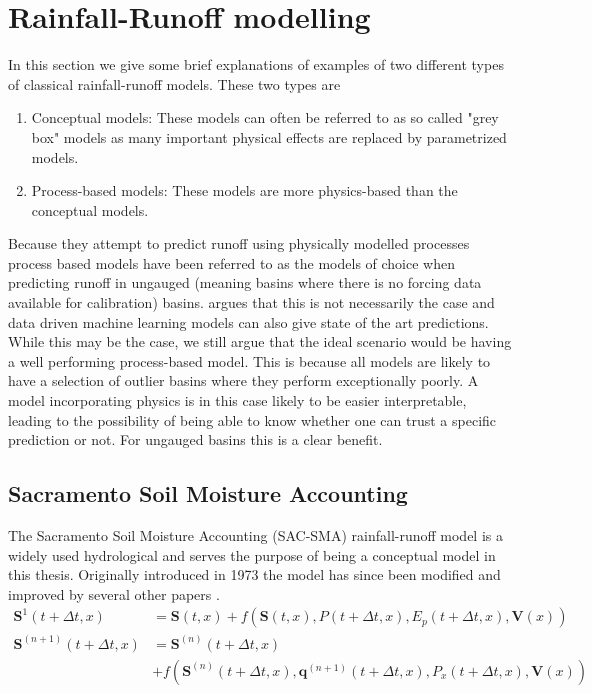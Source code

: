 \section{Rainfall-Runoff modelling}
In this section we give some brief explanations of examples of two different types 
of classical rainfall-runoff models. These two types are
\begin{enumerate}
    \item Conceptual models: These models can often be referred to as so called "grey box" models \citationneeded as many important physical effects are replaced by parametrized models.
    \item Process-based models: These models are more physics-based than the conceptual models. 
\end{enumerate}
Because they attempt to predict runoff using physically modelled processes process based models
have been referred to as the models of choice when predicting runoff in ungauged 
 (meaning basins where there is no forcing data available for calibration) basins. 
 \citet{lstm_third_paper} argues that this is not necessarily the case and data driven 
 machine learning models can also give state of the art predictions.
 While this may be the case, we still argue that the ideal scenario would be having 
 a well performing process-based model. This is because all models are likely to 
 have a selection of outlier basins where they perform exceptionally poorly. A model 
 incorporating physics is in this case likely to be easier interpretable, leading 
 to the possibility of being able to know whether one can trust a specific prediction or not. 
 For ungauged basins this is a clear benefit.
\subsection{Sacramento Soil Moisture Accounting}
The Sacramento Soil Moisture Accounting (SAC-SMA) \citep{SAC-SMA} rainfall-runoff model is a widely 
used hydrological and serves the purpose of being a conceptual model in this thesis.
Originally introduced in 1973 the model has since been modified and improved by 
several other papers \citep{SAC-SMA-physics}.
\begin{align}
    \bm{S}^1(t + \Delta t,x) &= \bm{S}(t,x) + f\left(\bm{S}(t,x),P(t+\Delta t,x),E_p (t+\Delta t, x), \bm{V}(x) \right) \\
    \bm{S}^{(n+1)}(t+\Delta t,x) &= \bm{S}^{(n)}(t+\Delta t, x) \nonumber \\
    &+ f\left( \bm{S}^{(n)}(t+\Delta t, x), \bm{q}^{(n+1)}(t+\Delta t,x),P_x(t+\Delta t,x),\bm{V}(x)  \right)
\end{align}

